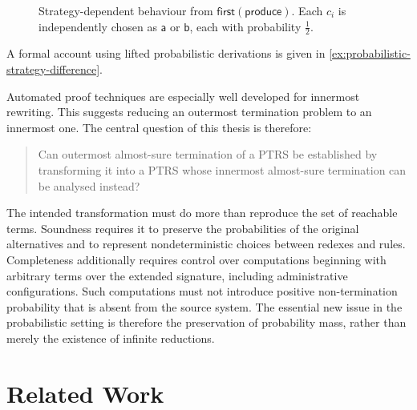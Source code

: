 \begin{figure}[htbp]
  \caption{Strategy-dependent behaviour from
    $\mathsf{first}(\mathsf{produce})$.  Each $c_i$ is independently chosen as
    $\mathsf a$ or $\mathsf b$, each with probability $\tfrac12$.}
  \label{fig:probabilistic-strategy-gap}
\end{figure}

A formal account using lifted probabilistic derivations is given in
\cref{ex:probabilistic-strategy-difference}.

Automated proof techniques are especially well developed for innermost
rewriting.  This suggests reducing an outermost termination problem to an
innermost one.  The central question of this thesis is therefore:

\begin{quote}
Can outermost almost-sure termination of a PTRS be established by transforming
it into a PTRS whose innermost almost-sure termination can be analysed instead?
\end{quote}

The intended transformation must do more than reproduce the set of reachable
terms.  Soundness requires it to preserve the probabilities of the original
alternatives and to represent nondeterministic choices between redexes and
rules.  Completeness additionally requires control over computations beginning
with arbitrary terms over the extended signature, including administrative
configurations.  Such computations must not introduce positive non-termination
probability that is absent from the source system.  The essential new issue in
the probabilistic setting is therefore the preservation of probability mass,
rather than merely the existence of infinite reductions.

\section{Related Work}

